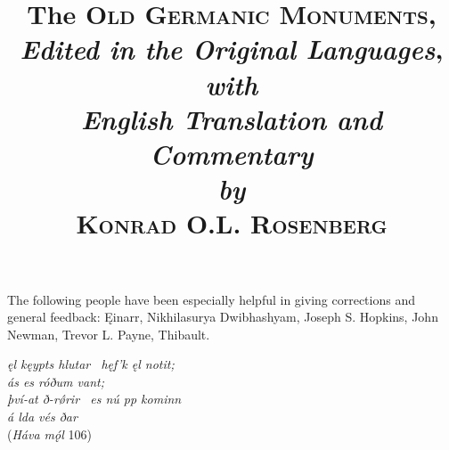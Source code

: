 \title{%
  \Huge The \textsc{Old Germanic Monuments}, \\
  \huge\emph{Edited in the Original Languages}, \\
  \large\emph{with} \\
  \huge\emph{English Translation and Commentary} \\
  \large\emph{by} \\
  \Huge \textsc{Konrad O.L. Rosenberg}
}

\maketitle

\newpage\thispagestyle{empty}

\begin{center} The following people have been especially helpful in giving corrections and general feedback: Ęinarr, Nikhilasurya Dwibhashyam, Joseph S. Hopkins, John Newman, Trevor L. Payne, Thibault.\end{center}

\begin{center} \emph{ęl kęypts hlutar \hld\ hęf’k ęl notit; \\
ás es róðum vant; \\
því-at ð-rǿrir \hld\ es nú pp kominn \\
á lda vés ðar} \\
(\emph{Háva mǫ́l} 106)\end{center}

\newpage\thispagestyle{empty}

\tableofcontents

\newpage

